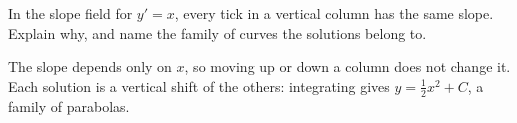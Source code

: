 \begin{Exercise}[label = field3]
In the slope field for $y' = x$, every tick in a vertical column has the same
slope. Explain why, and name the family of curves the solutions belong to.
\end{Exercise}

\begin{Answer}[ref = field3]
The slope depends only on $x$, so moving up or down a column does not change
it. Each solution is a vertical shift of the others: integrating gives
$y = \frac{1}{2}x^2 + C$, a family of parabolas.
\end{Answer}

